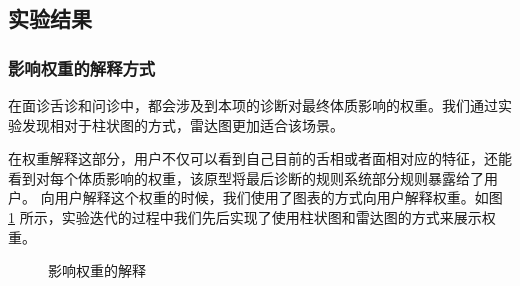 \subsection{实验结果}

\subsubsection{影响权重的解释方式}
在面诊舌诊和问诊中，都会涉及到本项的诊断对最终体质影响的权重。我们通过实验发现相对于柱状图的方式，雷达图更加适合该场景。

在权重解释这部分，用户不仅可以看到自己目前的舌相或者面相对应的特征，还能看到对每个体质影响的权重，该原型将最后诊断的规则系统部分规则暴露给了用户。
向用户解释这个权重的时候，我们使用了图表的方式向用户解释权重。如图 \ref{fig:question_weight} 所示，实验迭代的过程中我们先后实现了使用柱状图和雷达图的方式来展示权重。

\begin{figure}[htbp]
    \centering
    \caption{影响权重的解释}
    \label{fig:question_weight}
\end{figure}

